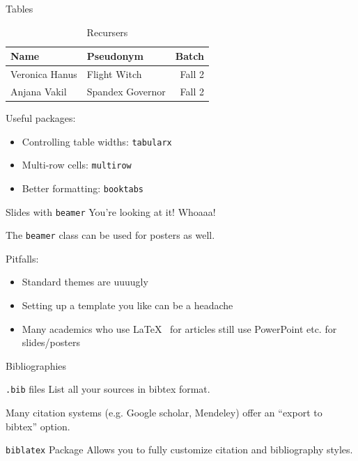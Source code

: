 \documentclass[xcolor={dvipsnames}]{beamer}
\begin{document}
\begin{frame}{Tables}

\begin{table}
	\caption{Recursers}
	\begin{tabular}{llr}
		\toprule
		Name 					& Pseudonym 				& Batch	\\
		\midrule
		Veronica Hanus 	& Flight Witch 				& Fall 2	\\
		Anjana Vakil 		& Spandex Governor 	& Fall 2	\\
		\bottomrule
	\end{tabular}
\end{table}

\begin{block}{Useful packages:}
\begin{itemize}
\item Controlling table widths: \texttt{tabularx}
\item Multi-row cells: \texttt{multirow}
\item Better formatting: \texttt{booktabs} 
\end{itemize}
\end{block}

\end{frame}

\begin{frame}{Slides with \texttt{beamer}}
 You're looking at it! Whoaaa!

\vfill

The \texttt{beamer} class can be used for posters as well.

\vfill

Pitfalls:
\begin{itemize}
\item Standard themes are uuuugly
\item Setting up a template you like can be a headache
\item Many academics who use \LaTeX~ for articles still use PowerPoint etc. for slides/posters
\end{itemize}
\end{frame}

\begin{frame}{Bibliographies}
\begin{block}{\texttt{.bib} files}
List all your sources in bibtex format.

Many citation systems (e.g. Google scholar, Mendeley) offer an ``export to bibtex'' option.
\end{block}
\begin{block}{\texttt{biblatex} Package}
Allows you to fully customize citation and bibliography styles.
\end{block}
\end{frame}
\end{document}

